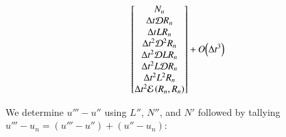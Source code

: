 \documentclass[letterpaper,11pt]{amsart}
\newcommand{\order}[2]{\ensuremath{O\!\left( {#1}^{#2} \right)}}
\begin{document}
\begin{subequations}
\begin{align}
\begin{bmatrix}
  N_{n} \\
  \Delta{}t \mathcal{D} R_{n} \\
  \Delta{}t L R_{n} \\
  \Delta{}t^{2} \mathcal{D}^{2} R_{n} \\
  \Delta{}t^{2} \mathcal{D} L R_{n} \\
  \Delta{}t^{2} L \mathcal{D} R_{n} \\
  \Delta{}t^{2} L^{2} R_{n} \\
  \Delta{}t^{2} \mathcal{E}\left( R_{n}, R_{n} \right)
\end{bmatrix}
  + \order{\Delta{}t}{3}
\notag
\end{align}
\end{subequations}

We determine $u'''-u''$ using $L''$, $N''$, and $N'$ followed by tallying
$u'''-u_{n} = (u'''-u'')+(u''-u_{n})$:
\end{document}
